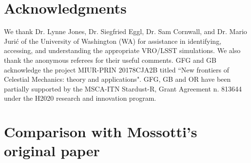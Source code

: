 \documentclass[11pt]{article}
\begin{document}
\section{Acknowledgments}
We thank Dr. Lynne Jones, Dr. Siegfried Eggl, Dr. Sam Cornwall, and Dr. Mario Juri\'c of the University of Washington (WA) for assistance in identifying, accessing, and understanding the appropriate VRO/LSST simulations. 
We also thank the anonymous referees for their useful comments.
GFG and GB acknowledge the project MIUR-PRIN 20178CJA2B titled ``New frontiers of Celestial Mechanics: theory and applications".  
GFG, GB and OR have been partially supported by the MSCA-ITN Stardust-R, Grant Agreement n. 813644 under the H2020 research and innovation program.



\appendix
\section{Comparison with Mossotti's original paper}
\label{append}
\end{document}
